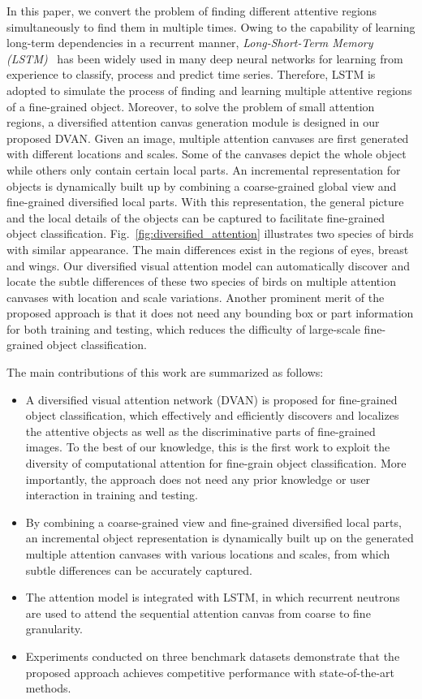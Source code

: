 \documentclass[journal]{IEEEtran}
\begin{document}
In this paper, we convert the problem of finding different attentive regions simultaneously to find them in multiple times. Owing to the capability of learning long-term dependencies in a recurrent manner, \emph{Long-Short-Term Memory (LSTM)}~\cite{Hochreiter:LSM} has been widely used in many deep neural networks for learning from experience to classify, process and predict time series. Therefore, LSTM is adopted to simulate the process of finding and learning multiple attentive regions of a fine-grained object.
Moreover, to solve the problem of small attention regions, a diversified attention canvas generation module is designed in our proposed DVAN. Given an image, multiple attention canvases are first generated with different locations and scales. Some of the canvases depict the whole object while others only contain certain local parts. An incremental representation for objects is dynamically built up by combining a coarse-grained global view and fine-grained diversified local parts. With this representation, the general picture and the local details of the objects can be captured to facilitate fine-grained object classification. Fig.~\ref{fig:diversified_attention} illustrates two species of birds with similar appearance. The main differences exist in the regions of eyes, breast and wings. Our diversified visual attention model can automatically discover and locate the subtle differences of these two species of birds on multiple attention canvases with location and scale variations. Another prominent merit of the proposed approach is that it does not need any bounding box or part information for both training and testing, which reduces the difficulty of large-scale fine-grained object classification.


The main contributions of this work are summarized as follows:
\begin{itemize}
  \item A diversified visual attention network (DVAN) is proposed for fine-grained object classification, which effectively and efficiently discovers and localizes the attentive objects as well as the discriminative parts of fine-grained images. To the best of our knowledge, this is the first work to exploit the diversity of computational attention for fine-grain object classification. More importantly, the approach does not need any prior knowledge or user interaction in training and testing.
  \item By combining a coarse-grained view and fine-grained diversified local parts, an incremental object representation is dynamically built up on the generated multiple attention canvases with various locations and scales, from which subtle differences can be accurately captured.
  \item The attention model is integrated with LSTM, in which recurrent neutrons are used to attend the sequential attention canvas from coarse to fine granularity.
  \item Experiments conducted on three benchmark datasets demonstrate that the proposed approach achieves competitive performance with state-of-the-art methods.
\end{itemize}
\end{document}
